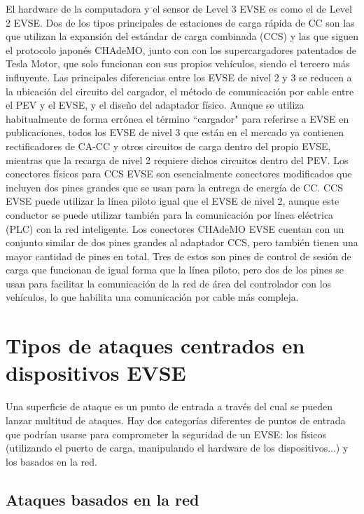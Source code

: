 \documentclass[12pt,a4paper,onecolumn,oneside]{report}
\begin{document}
El hardware de la computadora y el sensor de Level 3 EVSE es como el de Level 2 EVSE. Dos de los tipos principales de estaciones de carga rápida de CC son las que utilizan la expansión del estándar de carga combinada (CCS) y las que siguen el protocolo japonés CHAdeMO, junto con con los supercargadores patentados de Tesla Motor, que solo funcionan con sus propios vehículos, siendo el tercero más influyente. Las principales diferencias entre los EVSE de nivel 2 y 3 se reducen a la ubicación del circuito del cargador, el método de comunicación por cable entre el PEV y el EVSE, y el diseño del adaptador físico. Aunque se utiliza habitualmente de forma errónea el término ``cargador" para referirse a EVSE en publicaciones, todos los EVSE de nivel 3 que están en el mercado ya contienen rectificadores de CA-CC y otros circuitos de carga dentro del propio EVSE, mientras que la recarga de nivel 2 requiere dichos circuitos dentro del PEV. Los conectores físicos para CCS EVSE son esencialmente conectores modificados que incluyen dos pines grandes que se usan para la entrega de energía de CC. CCS EVSE puede utilizar la línea piloto igual que el EVSE de nivel 2, aunque este conductor se puede utilizar también para la comunicación por línea eléctrica (PLC) con la red inteligente. Los conectores CHAdeMO EVSE cuentan con un conjunto similar de dos pines grandes al adaptador CCS, pero también tienen una mayor cantidad de pines en total. Tres de estos son pines de control de sesión de carga que funcionan de igual forma que la línea piloto, pero dos de los pines se usan para facilitar la comunicación de la red de área del controlador con los vehículos, lo que habilita una comunicación por cable más compleja.

\section{Tipos de ataques centrados en dispositivos EVSE}
\label{Tipos de ataques centrados en dispositivos EVSE}

Una superficie de ataque es un punto de entrada a través del cual se pueden lanzar multitud de ataques. Hay dos categorías diferentes de puntos de entrada que podrían usarse para comprometer la seguridad de un EVSE: los físicos (utilizando el puerto de carga, manipulando el hardware de los dispositivos...) y los basados en la red.


\subsection{Ataques basados en la red}
\end{document}
